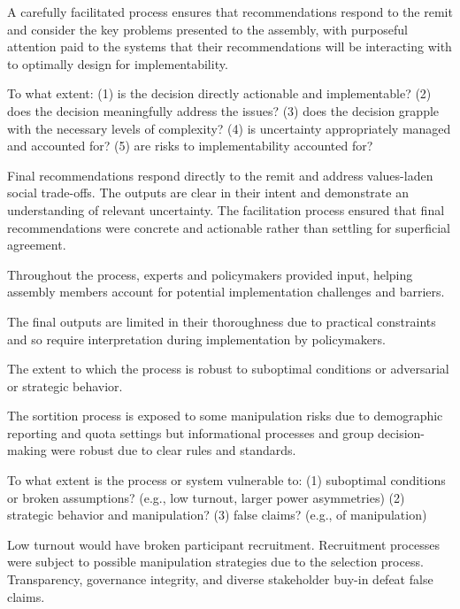    A carefully facilitated process ensures that recommendations respond to the remit and consider the key problems presented to the assembly, with purposeful attention paid to the systems that their recommendations will be interacting with to optimally design for implementability.
    
    \begin{evaluate}[grey]
        To what extent: (1) is the decision directly actionable and implementable? (2) does the decision meaningfully address the issues? (3) does the decision grapple with the necessary levels of complexity? (4) is uncertainty appropriately managed and accounted for? (5) are risks to implementability accounted for?
    \end{evaluate}

    Final recommendations respond directly to the remit and address values-laden social trade-offs. The outputs are clear in their intent and demonstrate an understanding of relevant uncertainty. The facilitation process ensured that final recommendations were concrete and actionable rather than settling for superficial agreement.

    Throughout the process, experts and policymakers provided input, helping assembly members account for potential implementation challenges and barriers.

    The final outputs are limited in their thoroughness due to practical constraints and so require interpretation during implementation by policymakers.
    
    
    \begin{describe}[grey]
        The extent to which the process is robust to suboptimal conditions or adversarial or strategic behavior.
    \end{describe}

    The sortition process is exposed to some manipulation risks due to demographic reporting and quota settings but informational processes and group decision-making were robust due to clear rules and standards.
    
    \begin{evaluate}[grey]
        To what extent is the process or system vulnerable to: (1) suboptimal conditions or broken assumptions? (e.g., low turnout, larger power asymmetries) (2) strategic behavior and manipulation? (3) false claims? (e.g., of manipulation)
    \end{evaluate}

    Low turnout would have broken participant recruitment. Recruitment processes were subject to possible manipulation strategies due to the selection process. Transparency, governance integrity, and diverse stakeholder buy-in defeat false claims.

